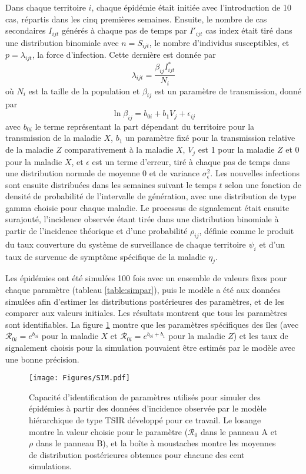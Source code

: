 Dans chaque territoire $i$, chaque épidémie était initiée avec l'introduction de 10 cas, répartis dans les cinq premières semaines.
Ensuite, le nombre de cas secondaires $I_{ijt}$ générés à chaque pas de temps par $I'_{ijt}$ cas index était tiré dans une distribution binomiale avec $n=S_{ijt}$, le nombre d'individus susceptibles, et $p=\lambda_{ijt}$, la force d'infection. 
Cette dernière est donnée par 
\begin{equation}
\lambda_{ijt}=\frac{\beta_{ij} I^*_{ijt}}{N_i}
\end{equation}
où $N_i$ est la taille de la population et $\beta_{ij}$ est un paramètre de transmission, donné par 
\begin{equation}
\ln \beta_{ij} = b_{0i} + b_1 V_j + \epsilon_{ij}
\end{equation}
avec $b_{0i}$ le terme représentant la part dépendant du territoire pour la transmission de la maladie $X$, $b_1$ un paramètre fixé pour la transmission relative de la maladie $Z$ comparativement à la maladie $X$, $V_j$ est 1 pour la maladie $Z$ et 0 pour la maladie $X$, et $\epsilon$ est un terme d'erreur, tiré à chaque pas de temps dans une distribution normale de moyenne 0 et de variance $\sigma_{\epsilon}^2$.  
Les nouvelles infections sont ensuite distribuées dans les semaines suivant le temps $t$ selon une fonction de densité de probabilité de l'intervalle de génération, avec une distribution de type gamma choisie pour chaque maladie.
Le processus de signalement était ensuite surajouté, l'incidence observée étant tirée dans une distribution binomiale à partir de l'incidence théorique et d'une probabilité $\rho_{ij}$, définie comme le produit du taux couverture du système de surveillance de chaque territoire $\psi_i$ et d'un taux de survenue de symptôme spécifique de la maladie $\eta_j$.

Les épidémies ont été simulées 100 fois avec un ensemble de valeurs fixes pour chaque paramètre (tableau \ref{table:simpar}), puis le modèle a été aux données simulées afin d'estimer les distributions postérieures des paramètres, et de les comparer aux valeurs initiales.
Les résultats montrent que tous les paramètres sont identifiables.
La figure \ref{fig:plotsim} montre que les paramètres spécifiques des îles (avec $\mathcal{R}_{0i}=e^{b_{0i}}$ pour la maladie $X$ et $\mathcal{R}_{0i}=e^{b_{0i} + b_1}$ pour la maladie $Z$) et les taux de signalement choisis pour la simulation pouvaient être estimés par le modèle avec une bonne précision.
\begin{figure}[h]
\centering
\caption{Capacité d'identification de paramètres utilisés pour simuler des épidémies à partir des données d'incidence observée par le modèle hiérarchique de type TSIR développé pour ce travail. Le losange montre la valeur choisie pour le paramètre ($\mathcal{R}_{0}$ dans le panneau A et $\rho$ dans le panneau B), et la boîte à moustaches montre les moyennes de distribution postérieures obtenues pour chacune des cent simulations.}
\label{fig:plotsim}
\texttt{[image: Figures/SIM.pdf]}
\end{figure}




